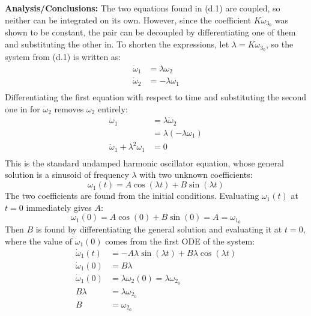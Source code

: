 \documentclass[titlepage]{article}
\begin{document}
\textbf{Analysis/Conclusions:}
The two equations found in (d.1) are coupled, so neither can be integrated on its own. However, since the coefficient $K\omega_{3_0}$ was shown to be constant, the pair can be decoupled by differentiating one of them and substituting the other in. To shorten the expressions, let $\lambda=K\omega_{3_0}$, so the system from (d.1) is written as:
\begin{equation}
	\begin{split}
		\dot{\omega}_1&=\lambda\omega_2 \\
		\dot{\omega}_2&=-\lambda\omega_1 \\
	\end{split}
\end{equation}
Differentiating the first equation with respect to time and substituting the second one in for $\dot{\omega}_2$ removes $\omega_2$ entirely:
\begin{equation}
	\begin{split}
		\ddot{\omega}_1&=\lambda\dot{\omega}_2 \\
		&=\lambda\left(-\lambda\omega_1\right) \\
		\ddot{\omega}_1+\lambda^2\omega_1&=0 \\
	\end{split}
\end{equation}
This is the standard undamped harmonic oscillator equation, whose general solution is a sinusoid of frequency $\lambda$ with two unknown coefficients:
\begin{equation}
	\omega_1(t)=A\cos\left(\lambda t\right)+B\sin\left(\lambda t\right)
\end{equation}
The two coefficients are found from the initial conditions. Evaluating $\omega_1(t)$ at $t=0$ immediately gives $A$:
\begin{equation}
	\omega_1(0)=A\cos\left(0\right)+B\sin\left(0\right)=A=\omega_{1_0}
\end{equation}
Then $B$ is found by differentiating the general solution and evaluating it at $t=0$, where the value of $\dot{\omega}_1(0)$ comes from the first ODE of the system:
\begin{equation}
	\begin{split}
		\dot{\omega}_1(t)&=-A\lambda\sin\left(\lambda t\right)+B\lambda\cos\left(\lambda t\right) \\
		\dot{\omega}_1(0)&=B\lambda \\
		\dot{\omega}_1(0)&=\lambda\omega_2(0)=\lambda\omega_{2_0} \\
		B\lambda&=\lambda\omega_{2_0} \\
		B&=\omega_{2_0} \\
	\end{split}
\end{equation}
\end{document}
